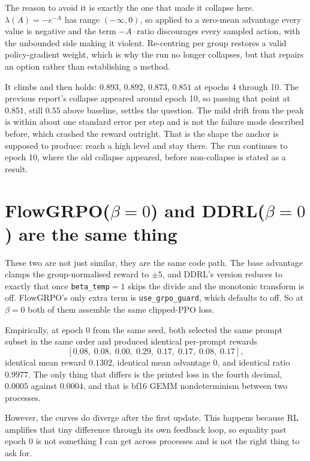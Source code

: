 \documentclass[11pt]{article}
\newcommand{\code}[1]{\texttt{\small #1}}
\begin{document}
The reason to avoid it is exactly the one that made it collapse here. $\lambda(A) = -e^{-A}$ has range $(-\infty, 0)$, so applied to a zero-mean advantage every value is negative and the term $-A\cdot\text{ratio}$ discourages every sampled action, with the unbounded side making it violent. Re-centring per group restores a valid policy-gradient weight, which is why the run no longer collapses, but that repairs an option rather than establishing a method.

It climbs and then holds: $0.893$, $0.892$, $0.873$, $0.851$ at epochs 4 through 10. The previous report's collapse appeared around epoch 10, so passing that point at $0.851$, still $0.55$ above baseline, settles the question. The mild drift from the peak is within about one standard error per step and is not the failure mode described before, which crashed the reward outright. That is the shape the anchor is supposed to produce: reach a high level and stay there. The run continues to epoch 10, where the old collapse appeared, before non-collapse is stated as a result.

\section{FlowGRPO($\beta{=}0$) and DDRL($\beta{=}0$) are the same thing}

These two are not just similar, they are the same code path. The base advantage clamps the group-normalised reward to $\pm 5$, and DDRL's version reduces to exactly that once \code{beta\_temp}$=1$ skips the divide and the monotonic transform is off. FlowGRPO's only extra term is \code{use\_grpo\_guard}, which defaults to off. So at $\beta=0$ both of them assemble the same clipped-PPO loss.

Empirically, at epoch 0 from the same seed, both selected the same prompt subset in the same order and produced identical per-prompt rewards
\[
[0.08,\; 0.08,\; 0.00,\; 0.29,\; 0.17,\; 0.17,\; 0.08,\; 0.17],
\]
identical mean reward $0.1302$, identical mean advantage $0$, and identical ratio $0.9977$. The only thing that differs is the printed loss in the fourth decimal, $0.0005$ against $0.0004$, and that is bf16 GEMM nondeterminism between two processes.

However, the curves do diverge after the first update. This happens because RL amplifies that tiny difference through its own feedback loop, so equality past epoch 0 is not something I can get across processes and is not the right thing to ask for.
\end{document}

